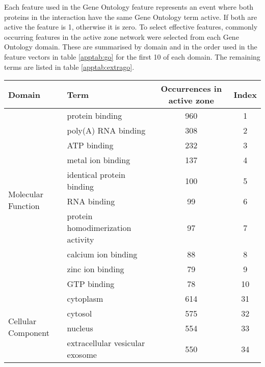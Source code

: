 Each feature used in the Gene Ontology feature represents an event where both proteins in the interaction have the same Gene Ontology term active.
If both are active the feature is 1, otherwise it is zero.
To select effective features, commonly occurring features in the active zone network were selected from each Gene Ontology domain.
These are summarised by domain and in the order used in the feature vectors in table \ref{apptab:go} for the first 10 of each domain.
The remaining terms are listed in table \ref{apptab:extrago}.

\begin{table}
    \centering
    \tiny
    \begin{tabular}{l p{} c c}
        Domain              & Term                      & Occurrences in active zone & Index\\
        \hline
        \multirow{10}{*}{Molecular Function}  & protein binding           & 960 & 1 \\
                                              & poly(A) RNA binding       & 308 & 2 \\
                                              & ATP binding               & 232  & 3 \\
                                              & metal ion binding         & 137 & 4 \\
                                              & identical protein binding & 100 & 5 \\
                                              & RNA binding               & 99 & 6 \\
                                              & protein homodimerization activity & 97 & 7 \\
                                              & calcium ion binding & 88 & 8 \\
                                              & zinc ion binding & 79 & 9 \\
                                              & GTP binding & 78 & 10 \\
        \hline
        \multirow{10}{*}{Cellular Component}  & cytoplasm & 614 & 31 \\
                                              & cytosol & 575 & 32 \\
                                              & nucleus & 554 & 33 \\
                                              & extracellular vesicular exosome & 550 & 34 \\

\end{tabular}
\end{table}
